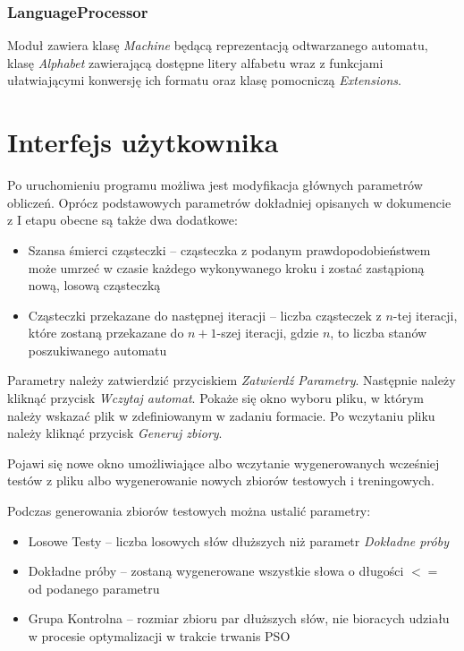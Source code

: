 \documentclass{../llncs_template/llncs}
\begin{document}
\subsubsection*{LanguageProcessor}
Moduł zawiera klasę \emph{Machine} będącą reprezentacją odtwarzanego automatu, klasę \emph{Alphabet} zawierającą dostępne litery alfabetu wraz z funkcjami ułatwiającymi konwersję ich formatu oraz klasę pomocniczą \emph{Extensions}.

\section{Interfejs użytkownika}
Po uruchomieniu programu możliwa jest modyfikacja głównych parametrów obliczeń. Oprócz podstawowych parametrów dokładniej opisanych w dokumencie z I etapu obecne są także dwa dodatkowe:

\begin{itemize}
\item Szansa śmierci cząsteczki -- cząsteczka z podanym prawdopodobieństwem może umrzeć w czasie każdego wykonywanego kroku i zostać zastąpioną nową, losową cząsteczką
\item Cząsteczki przekazane do następnej iteracji -- liczba cząsteczek z $n$-tej iteracji, które zostaną przekazane do $n+1$-szej iteracji, gdzie $n$, to liczba stanów poszukiwanego automatu
\end{itemize}

Parametry należy zatwierdzić przyciskiem \emph{Zatwierdź Parametry}. Następnie należy kliknąć przycisk \emph{Wczytaj automat}. Pokaże się okno wyboru pliku, w którym należy wskazać plik w zdefiniowanym w zadaniu formacie. Po wczytaniu pliku należy kliknąć przycisk \emph{Generuj zbiory}.

Pojawi się nowe okno umożliwiające albo wczytanie wygenerowanych wcześniej testów z pliku albo wygenerowanie nowych zbiorów testowych i treningowych.

\newpage

 Podczas generowania zbiorów testowych można ustalić parametry:

\begin{itemize}
\item Losowe Testy -- liczba losowych słów dłuższych niż parametr \emph{Dokładne próby}
\item Dokładne próby -- zostaną wygenerowane wszystkie słowa o długości $<=$ od podanego parametru
\item Grupa Kontrolna -- rozmiar zbioru par dłuższych słów, nie bioracych udziału w procesie optymalizacji w trakcie trwanis PSO
\end{itemize}
\end{document}
